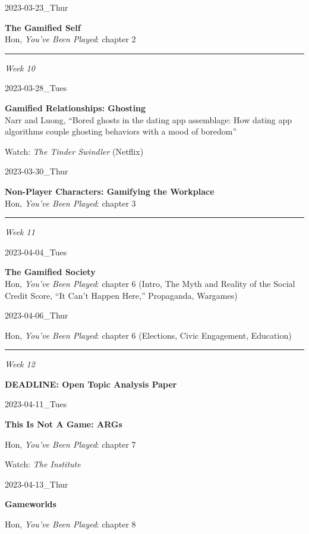 \documentclass[
  letterpaper,
  DIV=11,
  numbers=noendperiod]{scrartcl}
\begin{document}
2023-03-23\_Thur

\textbf{The Gamified Self}\\
Hon, \emph{You've Been Played}: chapter 2

\begin{center}\rule{0.5\linewidth}{0.5pt}\end{center}

\emph{Week 10}

2023-03-28\_Tues

\textbf{Gamified Relationships: Ghosting}\\
Narr and Luong, ``Bored ghosts in the dating app assemblage: How dating
app algorithms couple ghosting behaviors with a mood of boredom''

Watch: \emph{The Tinder Swindler} (Netflix)

2023-03-30\_Thur

\textbf{Non-Player Characters: Gamifying the Workplace}\\
Hon, \emph{You've Been Played}: chapter 3

\begin{center}\rule{0.5\linewidth}{0.5pt}\end{center}

\emph{Week 11}

2023-04-04\_Tues

\textbf{The Gamified Society}\\
Hon, \emph{You've Been Played}: chapter 6 (Intro, The Myth and Reality
of the Social Credit Score, ``It Can't Happen Here,'' Propaganda,
Wargames)

2023-04-06\_Thur

Hon, \emph{You've Been Played}: chapter 6 (Elections, Civic Engagement,
Education)

\begin{center}\rule{0.5\linewidth}{0.5pt}\end{center}

\emph{Week 12}

\textbf{DEADLINE: Open Topic Analysis Paper}

2023-04-11\_Tues

\textbf{This Is Not A Game: ARGs}

Hon, \emph{You've Been Played}: chapter 7

Watch: \emph{The Institute}

2023-04-13\_Thur

\textbf{Gameworlds}

Hon, \emph{You've Been Played}: chapter 8
\end{document}
